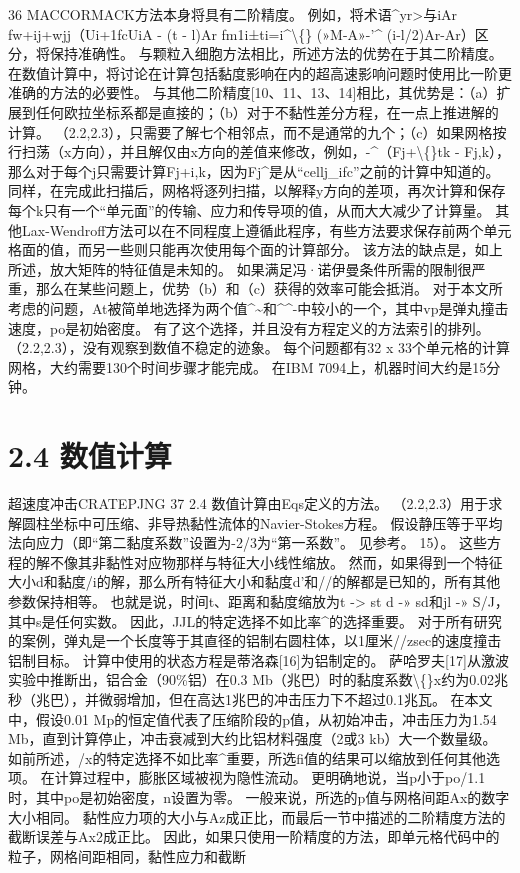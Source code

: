 \documentclass[UTF8,11pt,a4paper,openany,fontset=fandol]{ctexbook}
\begin{document}
36 MACCORMACK方法本身将具有二阶精度。 例如，将术语\textasciicircum{}yr>与iAr fw+ij+wjj（Ui+1fcUiA - (t - l)Ar fm1i±ti=i\textasciicircum{}\textbackslash\{\} (»M-A»-'\textasciicircum{} (i-l/2)Ar-Ar）区分，将保持准确性。 与颗粒入细胞方法相比，所述方法的优势在于其二阶精度。 在数值计算中，将讨论在计算包括黏度影响在内的超高速影响问题时使用比一阶更准确的方法的必要性。 与其他二阶精度[10、11、13、14]相比，其优势是：（a）扩展到任何欧拉坐标系都是直接的；（b）对于不黏性差分方程，在一点上推进解的计算。 （2.2,2.3），只需要了解七个相邻点，而不是通常的九个；（c）如果网格按行扫荡（x方向），并且解仅由x方向的差值来修改，例如，-\textasciicircum{}（Fj+\textbackslash\{\}tk - Fj,k），那么对于每个j只需要计算Fj+i,k，因为Fj\textasciicircum{}是从“cellj\_ifc”之前的计算中知道的。 同样，在完成此扫描后，网格将逐列扫描，以解释y方向的差项，再次计算和保存每个k只有一个“单元面”的传输、应力和传导项的值，从而大大减少了计算量。 其他Lax-Wendroff方法可以在不同程度上遵循此程序，有些方法要求保存前两个单元格面的值，而另一些则只能再次使用每个面的计算部分。 该方法的缺点是，如上所述，放大矩阵的特征值是未知的。 如果满足冯·诺伊曼条件所需的限制很严重，那么在某些问题上，优势（b）和（c）获得的效率可能会抵消。 对于本文所考虑的问题，At被简单地选择为两个值\textasciicircum{}\textasciitilde{}和\textasciicircum{}\textasciicircum{}-中较小的一个，其中vp是弹丸撞击速度，po是初始密度。 有了这个选择，并且没有方程定义的方法索引的排列。 （2.2,2.3），没有观察到数值不稳定的迹象。 每个问题都有32 x 33个单元格的计算网格，大约需要130个时间步骤才能完成。 在IBM 7094上，机器时间大约是15分钟。

\section{2.4 数值计算}
超速度冲击CRATEPJNG 37 2.4 数值计算由Eqs定义的方法。 （2.2,2.3）用于求解圆柱坐标中可压缩、非导热黏性流体的Navier-Stokes方程。 假设静压等于平均法向应力（即“第二黏度系数”设置为-2/3为“第一系数”。 见参考。 15）。 这些方程的解不像其非黏性对应物那样与特征大小线性缩放。 然而，如果得到一个特征大小d和黏度/i的解，那么所有特征大小和黏度d'和//的解都是已知的，所有其他参数保持相等。 也就是说，时间t、距离和黏度缩放为t -> st d -» sd和jl -» S/J，其中s是任何实数。 因此，JJL的特定选择不如比率\textasciicircum{}的选择重要。 对于所有研究的案例，弹丸是一个长度等于其直径的铝制右圆柱体，以1厘米//zsec的速度撞击铝制目标。 计算中使用的状态方程是蒂洛森[16]为铝制定的。 萨哈罗夫[17]从激波实验中推断出，铝合金（90\%铝）在0.3 Mb（兆巴）时的黏度系数\textbackslash\{\}x约为0.02兆秒（兆巴），并微弱增加，但在高达1兆巴的冲击压力下不超过0.1兆瓦。 在本文中，假设0.01 Mp的恒定值代表了压缩阶段的p值，从初始冲击，冲击压力为1.54 Mb，直到计算停止，冲击衰减到大约比铝材料强度（2或3 kb）大一个数量级。 如前所述，/x的特定选择不如比率\textasciicircum{}重要，所选fi值的结果可以缩放到任何其他选项。 在计算过程中，膨胀区域被视为隐性流动。 更明确地说，当p小于po/1.1时，其中po是初始密度，n设置为零。 一般来说，所选的p值与网格间距Ax的数字大小相同。 黏性应力项的大小与Az成正比，而最后一节中描述的二阶精度方法的截断误差与Ax2成正比。 因此，如果只使用一阶精度的方法，即单元格代码中的粒子，网格间距相同，黏性应力和截断
\end{document}
